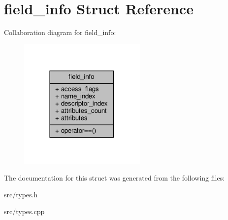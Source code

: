 \hypertarget{structfield__info}{}\section{field\+\_\+info Struct Reference}
\label{structfield__info}


Collaboration diagram for field\+\_\+info\+:\nopagebreak
\begin{figure}[H]
\begin{center}
\leavevmode
\includegraphics[width=177pt]{structfield__info__coll__graph}
\end{center}
\end{figure}


The documentation for this struct was generated from the following files\+:\begin{DoxyCompactItemize}
\item 
src/types.\+h\item 
src/types.\+cpp\end{DoxyCompactItemize}
